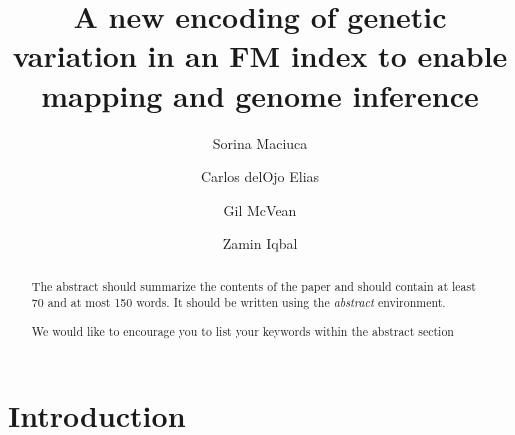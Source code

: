 \documentclass[runningheads,a4paper]{llncs}
\newcommand{\keywords}[1]{\par\addvspace\baselineskip
\noindent\keywordname\enspace\ignorespaces#1}
\begin{document}
\mainmatter  %

\title{A new encoding of genetic variation in an FM index to enable mapping and genome inference}


%
%
\author{Sorina Maciuca%
\and Carlos delOjo Elias\and Gil McVean \and Zamin Iqbal}
%



\maketitle


\begin{abstract}

The abstract should summarize the contents of the paper and should
contain at least 70 and at most 150 words. It should be written using the
\emph{abstract} environment.
\keywords{We would like to encourage you to list your keywords within
the abstract section}
\end{abstract}

\section{Introduction}
\end{document}
